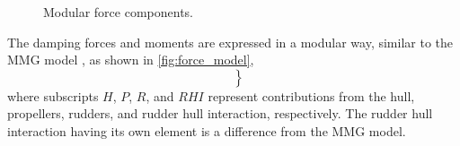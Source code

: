 \begin{figure}[h]
    \centering
    
    \caption{Modular force components.}
    \label{fig:force_model}
\end{figure}

The damping forces and moments are expressed in a modular way, similar to the MMG model \citep{yasukawaIntroductionMMGStandard2015}, as shown in \autoref{fig:force_model},
\begin{equation}
    \label{eq:X_D}
    \left.\begin{aligned}
     \\
     \\
    
    \end{aligned}\right\}
\end{equation}
%
%     
%     
where subscripts $H$, $P$, $R$, and $RHI$ represent contributions from the hull, propellers, rudders, and rudder hull interaction, respectively. The rudder hull interaction having its own element is a difference from the MMG model.